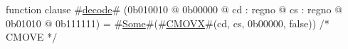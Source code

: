function clause #\hyperref[zdecode]{decode}# (0b010010 @ 0b00000 @ cd : regno @ cs : regno @    0b01010 @ 0b111111) = #\hyperref[zSome]{Some}#(#\hyperref[zCMOVX]{CMOVX}#(cd, cs, 0b00000, false)) /* CMOVE */
